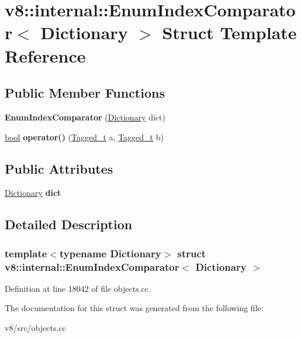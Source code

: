 \hypertarget{structv8_1_1internal_1_1EnumIndexComparator}{}\section{v8\+:\+:internal\+:\+:Enum\+Index\+Comparator$<$ Dictionary $>$ Struct Template Reference}
\label{structv8_1_1internal_1_1EnumIndexComparator}
\subsection*{Public Member Functions}
\begin{DoxyCompactItemize}
\item 
\mbox{\label{structv8_1_1internal_1_1EnumIndexComparator_a97d270eb1bdd667d25c5e116dbd703f7}} 
{\bfseries Enum\+Index\+Comparator} (\mbox{\hyperlink{classv8_1_1internal_1_1Dictionary}{Dictionary}} dict)
\item 
\mbox{\label{structv8_1_1internal_1_1EnumIndexComparator_aaeba9984fa9b6baae87b7f45036e2367}} 
\mbox{\hyperlink{classbool}{bool}} {\bfseries operator()} (\mbox{\hyperlink{classuintptr__t}{Tagged\+\_\+t}} a, \mbox{\hyperlink{classuintptr__t}{Tagged\+\_\+t}} b)
\end{DoxyCompactItemize}
\subsection*{Public Attributes}
\begin{DoxyCompactItemize}
\item 
\mbox{\label{structv8_1_1internal_1_1EnumIndexComparator_aa63bbb6388daaf0ce2ba3bfe03b5d0a1}} 
\mbox{\hyperlink{classv8_1_1internal_1_1Dictionary}{Dictionary}} {\bfseries dict}
\end{DoxyCompactItemize}


\subsection{Detailed Description}
\subsubsection*{template$<$typename Dictionary$>$\newline
struct v8\+::internal\+::\+Enum\+Index\+Comparator$<$ Dictionary $>$}



Definition at line 18042 of file objects.\+cc.



The documentation for this struct was generated from the following file\+:\begin{DoxyCompactItemize}
\item 
v8/src/objects.\+cc\end{DoxyCompactItemize}
